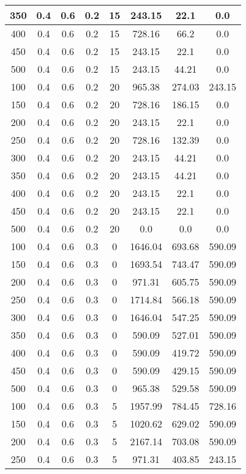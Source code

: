 \documentclass[a4paper, 12pt]{extreport}
\begin{document}
\begin{itemize}
\begin{longtable}{|c|c|c|c|c|c|c|c|}
			350 & 0.4 & 0.6 & 0.2 & 15 & 243.15 & 22.1 & 0.0 \\\hline
			400 & 0.4 & 0.6 & 0.2 & 15 & 728.16 & 66.2 & 0.0 \\\hline
			450 & 0.4 & 0.6 & 0.2 & 15 & 243.15 & 22.1 & 0.0 \\\hline
			500 & 0.4 & 0.6 & 0.2 & 15 & 243.15 & 44.21 & 0.0 \\\hline
			100 & 0.4 & 0.6 & 0.2 & 20 & 965.38 & 274.03 & 243.15 \\\hline
			150 & 0.4 & 0.6 & 0.2 & 20 & 728.16 & 186.15 & 0.0 \\\hline
			200 & 0.4 & 0.6 & 0.2 & 20 & 243.15 & 22.1 & 0.0 \\\hline
			250 & 0.4 & 0.6 & 0.2 & 20 & 728.16 & 132.39 & 0.0 \\\hline
			300 & 0.4 & 0.6 & 0.2 & 20 & 243.15 & 44.21 & 0.0 \\\hline
			350 & 0.4 & 0.6 & 0.2 & 20 & 243.15 & 44.21 & 0.0 \\\hline
			400 & 0.4 & 0.6 & 0.2 & 20 & 243.15 & 22.1 & 0.0 \\\hline
			450 & 0.4 & 0.6 & 0.2 & 20 & 243.15 & 22.1 & 0.0 \\\hline
			500 & 0.4 & 0.6 & 0.2 & 20 & 0.0 & 0.0 & 0.0 \\\hline
			100 & 0.4 & 0.6 & 0.3 & 0 & 1646.04 & 693.68 & 590.09 \\\hline
			150 & 0.4 & 0.6 & 0.3 & 0 & 1693.54 & 743.47 & 590.09 \\\hline
			200 & 0.4 & 0.6 & 0.3 & 0 & 971.31 & 605.75 & 590.09 \\\hline
			250 & 0.4 & 0.6 & 0.3 & 0 & 1714.84 & 566.18 & 590.09 \\\hline
			300 & 0.4 & 0.6 & 0.3 & 0 & 1646.04 & 547.25 & 590.09 \\\hline
			350 & 0.4 & 0.6 & 0.3 & 0 & 590.09 & 527.01 & 590.09 \\\hline
			400 & 0.4 & 0.6 & 0.3 & 0 & 590.09 & 419.72 & 590.09 \\\hline
			450 & 0.4 & 0.6 & 0.3 & 0 & 590.09 & 429.15 & 590.09 \\\hline
			500 & 0.4 & 0.6 & 0.3 & 0 & 965.38 & 529.58 & 590.09 \\\hline
			100 & 0.4 & 0.6 & 0.3 & 5 & 1957.99 & 784.45 & 728.16 \\\hline
			150 & 0.4 & 0.6 & 0.3 & 5 & 1020.62 & 629.02 & 590.09 \\\hline
			200 & 0.4 & 0.6 & 0.3 & 5 & 2167.14 & 703.08 & 590.09 \\\hline
			250 & 0.4 & 0.6 & 0.3 & 5 & 971.31 & 403.85 & 243.15 \\\hline

\end{longtable}
\end{itemize}
\end{document}
